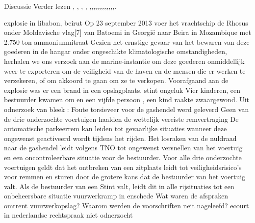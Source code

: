 \cite{Whitehead2017ukrainepoweroutage}
{Discussie}
{Verder lezen}
\cite{shahzad2014ScadaProtocolsPollingScenario},
\cite{grammatikis2019AttackIEC6087505104},
\cite{2017win32industroyer},
\cite{yadav2020reviewScadaArchitecture},
\cite{arrizabalaga2020surveyiiotProtocols},\cite{fauri2017EncryptionICS},\cite{resch31102019IEC62351secureCommunication},\cite{levalle2020FuzzingICSProtocols},\cite{blackhatusa2017},\cite{blackhatusa2017},\cite{abb30062017crashoverridenotification},\cite{spinner2018crashoverrideiot},\cite{njccicthreat08102017crashovverrideprofile},\cite{slowikvb2018crashoverride},\cite{crashoverridenetwork},\cite{wikiindustroyer},\cite{icsSecurityRussianHacking},\cite{holappa2017threattoElectricityNetworks}.

\newline \indent explosie in libabon, beirut 
Op 23 september 2013 voer het vrachtschip de Rhosus onder Moldavische vlag[7] van Batoemi in Georgië naar Beira in Mozambique met 2.750 ton ammoniumnitraat
Gezien het ernstige gevaar van het bewaren van deze goederen in de hangar onder ongeschikte klimatologische omstandigheden, herhalen we ons verzoek aan de marine-instantie om deze goederen onmiddellijk weer te exporteren om de veiligheid van de haven en de mensen die er werken te verzekeren, of om akkoord te gaan om ze te verkopen.
Voorafgaand aan de explosie was er een brand in een opslagplaats. 
\cite{hrw03082021investigateBeirutBlast}
\cite{souaibyElHussein112020Beirutstory}
\cite{ifrc2020chemicalexplosionBeirutPort}
\newline \indent  stint ongeluk
Vier kinderen, een bestuurder kwamen om en een vijfde persoon , een kind raakte zwaargewond. Uit odnerzoek van bleek :
Foute torsieveer voor de gashendel werd geleverd
Geen van de drie onderzochte voertuigen haalden de wettelijk vereiste remvertraging
De automatische parkeerrem kan leiden tot gevaarlijke situaties wanneer deze ongewenst geactiveerd wordt tijdens het rijden. 
Het losraken van de nuldraad naar de gashendel leidt volgens TNO tot ongewenst versnellen van het voertuig en een oncontroleerbare situatie voor de bestuurder.
Voor alle drie onderzochte voertuigen geldt dat het ontbreken van een zitplaats leidt tot veiligheidsrisico’s voor remmen en sturen door de grotere kans dat de bestuurder van het voertuig valt. Als de bestuurder van een Stint valt, leidt dit in alle rijsituaties tot een onbeheersbare situatie
\cite{TNOStint}
\newline \indent vuurwerkramp in enschede 
\cite{boogers092002RampenRegelsRichtlijnen}
Wat waren de afspraken omtrent vuurwerkopslag?
Waarom werden de voorschriften neit nageleefd?
\newline \indent  ecourt in nederlandse rechtspraak
niet odnerzocht

